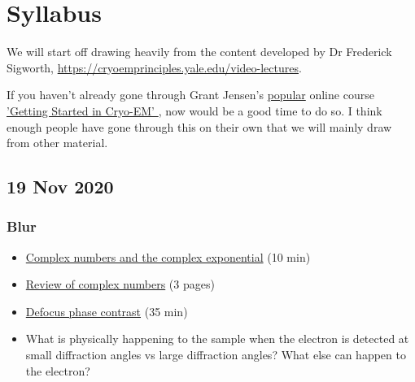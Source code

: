 \documentclass[11pt, oneside]{article}   	%
\begin{document}
\section{Syllabus}
We will start off drawing heavily from the content developed by Dr Frederick Sigworth, \url{https://cryoemprinciples.yale.edu/video-lectures}. 

If you haven't already gone through Grant Jensen's \href{https://www.caltech.edu/about/news/grant-jensen-cryo-em}{popular} online course \href{https://jensenlab.caltech.edu/courses/}{'Getting Started in Cryo-EM' }, now would be a good time to do so. I think enough people have gone through this on their own that we will mainly draw from other material. 

\pagebreak
\subsection{19 Nov 2020}
\subsubsection{Blur}
\begin{itemize}
\item \href{https://yale.app.box.com/s/frs9qtm28lsb1cts9bvxsh9nn6m6zbzv}{Complex numbers and the complex exponential} (10 min)
\item \href{https://cryoemprinciples.yale.edu/sites/default/files/files/1%20Review%20of%20Complex%20Numbers.pdf}{Review	of complex	numbers} (3 pages)
\item \href{https://yale.app.box.com/s/2nciyzqd576e61kpopi7zdd08gsl35zz}{Defocus phase contrast} (35 min)

\end{itemize}
\begin{itemize}
\item What is physically happening to the sample when the electron is detected at small diffraction angles vs large diffraction angles? What else can happen to the electron?
\end{itemize}
\end{document}
